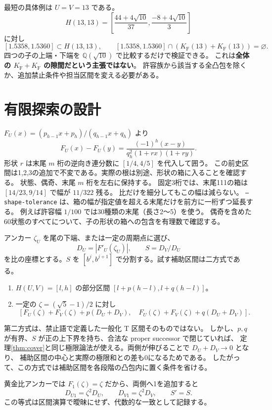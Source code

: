 \documentclass[10pt,a4paper]{article}
\newcommand{\KF}{K_{\mathrm F}}
\begin{document}
最短の具体例は $U=V=13$ である。
\[
 H(13,13)=\left[\frac{44+4\sqrt{10}}{37},\frac{-8+4\sqrt{10}}3\right]
\]
に対し
\[
 [1.5358,1.5360]\subset H(13,13),\qquad
 [1.5358,1.5360]\cap(\KF(13)+\KF(13))=\varnothing.
\]
四つの子の上端・下端を $\mathbb Q(\sqrt{10})$ で比較するだけで検証できる。
これは\textbf{全体の $\KF+\KF$ の隙間だという主張ではない}。
許容族から該当する全凸包を除くか、追加禁止条件や担当区間を変える必要がある。

\section{有限探索の設計}
$F_U(x)=(p_{h-1}x+p_h)/(q_{h-1}x+q_h)$ より
\[
 F_U(x)-F_U(y)=\frac{(-1)^h(x-y)}{q_h^2(1+rx)(1+ry)}.
\]
形状 $r$ は末尾 $m$ 桁の逆向き連分数に $[1/4,4/5]$ を代入して囲う。
この前史区間は1,2,3の追加で不変である。実際の根は別途、形状の箱に入ることを確認する。
状態、偶奇、末尾 $m$ 桁を左右に保持する。
固定3桁では、末尾111の箱は $[14/23,9/14]$ で幅が $11/322$ 残る。
比だけを細分してもこの幅は減らない。
\texttt{--shape-tolerance} は、箱の幅が指定値を超える末尾だけを前方に一桁ずつ延長する。
例えば許容幅 $1/100$ では30種類の末尾（長さ2〜5）を使う。
偶奇を含めた60状態のすべてについて、子の形状の箱への包含を有理数で確認する。

アンカー $\zeta_U$ を尾の下端、または一定の周期点に選び、
\[
 D_U=|F'_U(\zeta_U)|,\qquad S=D_V/D_U
\]
を比の座標とする。$S$ を $[b^j,b^{j+1}]$ で分割する。試す補助区間は二方式である。
\begin{enumerate}
\item $H(U,V)=[l,h]$ の部分区間 $[l+p(h-l),l+q(h-l)]$。
\item 一定の $\zeta=(\sqrt5-1)/2$ に対し
\[
 [F_U(\zeta)+F_V(\zeta)+p(D_U+D_V),\quad
  F_U(\zeta)+F_V(\zeta)+q(D_U+D_V)].
\]
\end{enumerate}
第二方式は、禁止語で定義した一般化 T 区間そのものではない。
しかし、$p,q$ が有界、$S$ が正の上下界を持ち、合法な proper successor で閉じていれば、
定理\ref{thm:cover}と同じ極限論法が使える。両側が伸びることで $D_U+D_V\to0$ となり、
補助区間の中心と実際の極限和との差も0になるためである。
したがって、この方式では補助区間を各段階の凸包内に置く条件を省ける。

黄金比アンカーでは $F_1(\zeta)=\zeta$ だから、両側へ1を追加すると
\[
 D_{U1}=\zeta^2D_U,\qquad D_{V1}=\zeta^2D_V,\qquad S'=S.
\]
この等式は区間演算で曖昧にせず、代数的な一致として記録する。
\end{document}
